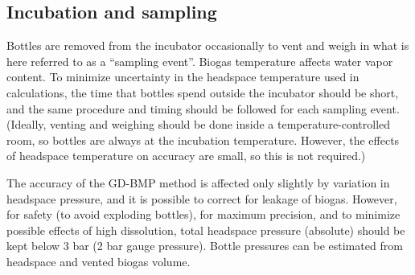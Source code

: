 \documentclass[]{article}
\begin{document}
\subsection{Incubation and sampling}
Bottles are removed from the incubator occasionally to vent and weigh in what is here referred to as a ``sampling event''. 
Biogas temperature affects water vapor content. 
To minimize uncertainty in the headspace temperature used in calculations, the time that bottles spend outside the incubator should be short, and the same procedure and timing should be followed for each sampling event. 
(Ideally, venting and weighing should be done inside a temperature-controlled room, so bottles are always at the incubation temperature. 
However, the effects of headspace temperature on accuracy are small, so this is not required.)

The accuracy of the GD-BMP method is affected only slightly by variation in headspace pressure, and it is possible to correct for leakage of biogas. 
However, for safety (to avoid exploding bottles), for maximum precision, and to minimize possible effects of high  dissolution, total headspace pressure (absolute) should be kept below 3 bar (2 bar gauge pressure). 
Bottle pressures can be estimated from headspace and vented biogas volume.
\end{document}
